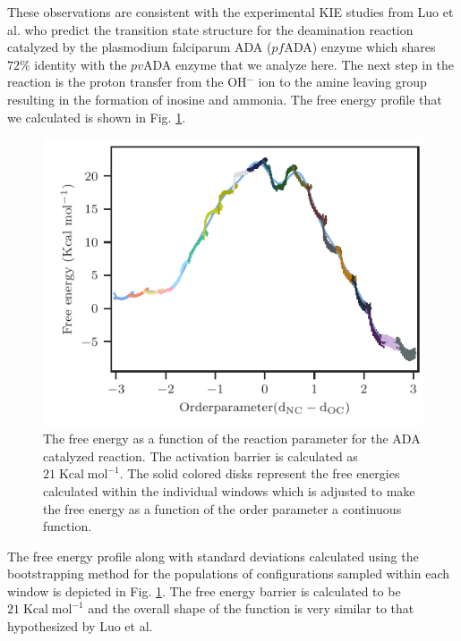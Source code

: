 \documentclass[journal=jpcbfk,manuscript=article,layout=traditional]{achemso}
\begin{document}
These observations are consistent with the 
experimental KIE studies from Luo et al. \cite{Luo07JAmChemSoc129p8008}
who predict the transition state structure for the deamination reaction 
catalyzed by the plasmodium falciparum ADA ($pf$ADA) enzyme which shares
$72\%$ identity with the $pv$ADA enzyme that we analyze here. The next
step in the reaction is the proton transfer from the OH$^{-}$ ion to the 
amine leaving group resulting in the formation of inosine and ammonia.   
The free energy profile that we calculated is shown in Fig. \ref{fig:ada-fenergy}.  
\begin{figure}[h!]
\centering
\includegraphics[scale=1.0]{figures/ada-fenergy.pdf}
\caption{The free energy as a function of the reaction 
parameter for the ADA catalyzed reaction. The activation barrier is calculated as 
$21\;\text{Kcal}\;\text{mol}^{-1}$. The solid colored disks represent the free energies 
calculated within the individual windows which is adjusted to make the free energy as a function 
of the order parameter a continuous function.}
\label{fig:ada-fenergy}
\end{figure}
The free energy profile along with standard deviations calculated 
using the bootstrapping method for the populations of configurations 
sampled within each window \cite{Hub10JChemTheoryComput6p3713} is 
depicted in Fig. \ref{fig:ada-fenergy}.
The free energy barrier is calculated to be $21\;\text{Kcal}\;\text{mol}^{-1}$
and the overall shape of the function is very similar to that hypothesized 
by Luo et al. \cite{Luo07JAmChemSoc129p8008}
\end{document}
